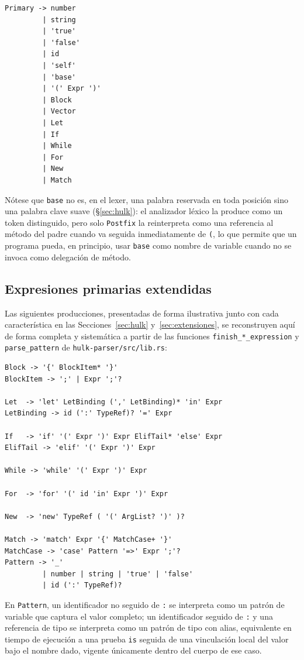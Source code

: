\documentclass[12pt, a4paper]{article}
\begin{document}
\begin{lstlisting}[language={}]
Primary -> number
         | string
         | 'true'
         | 'false'
         | id
         | 'self'
         | 'base'
         | '(' Expr ')'
         | Block
         | Vector
         | Let
         | If
         | While
         | For
         | New
         | Match
\end{lstlisting}

Nótese que \texttt{base} no es, en el lexer, una palabra reservada en toda
posición sino una palabra clave suave (\S\ref{sec:hulk}): el analizador léxico
la produce como un token distinguido, pero solo \texttt{Postfix} la
reinterpreta como una referencia al método del padre cuando va seguida
inmediatamente de \texttt{(}, lo que permite que un programa pueda, en
principio, usar \texttt{base} como nombre de variable cuando no se invoca
como delegación de método.

\subsection{Expresiones primarias extendidas}

Las siguientes producciones, presentadas de forma ilustrativa junto con cada
característica en las Secciones~\ref{sec:hulk} y~\ref{sec:extensiones}, se
reconstruyen aquí de forma completa y sistemática a partir de las funciones
\texttt{finish\_*\_expression} y \texttt{parse\_pattern} de
\texttt{hulk-parser/src/lib.rs}:

\begin{lstlisting}[language={}]
Block -> '{' BlockItem* '}'
BlockItem -> ';' | Expr ';'?

Let  -> 'let' LetBinding (',' LetBinding)* 'in' Expr
LetBinding -> id (':' TypeRef)? '=' Expr

If   -> 'if' '(' Expr ')' Expr ElifTail* 'else' Expr
ElifTail -> 'elif' '(' Expr ')' Expr

While -> 'while' '(' Expr ')' Expr

For  -> 'for' '(' id 'in' Expr ')' Expr

New  -> 'new' TypeRef ( '(' ArgList? ')' )?

Match -> 'match' Expr '{' MatchCase+ '}'
MatchCase -> 'case' Pattern '=>' Expr ';'?
Pattern -> '_'
         | number | string | 'true' | 'false'
         | id (':' TypeRef)?
\end{lstlisting}

En \texttt{Pattern}, un identificador no seguido de \texttt{:} se interpreta
como un patrón de variable que captura el valor completo; un identificador
seguido de \texttt{:} y una referencia de tipo se interpreta como un patrón de
tipo con alias, equivalente en tiempo de ejecución a una prueba \texttt{is}
seguida de una vinculación local del valor bajo el nombre dado, vigente
únicamente dentro del cuerpo de ese caso.
\end{document}
